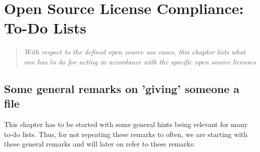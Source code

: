 %
%
%
%
%


\chapter{Open Source License Compliance: To-Do Lists}

\footnotesize
\begin{quote}\itshape
With respect to the defined open source use cases, this chapter lists what one
has to do for acting in accordance with the specific open source licenses
\end{quote}
\normalsize{}

\section{Some general remarks on 'giving' someone a file}

This chapter has to be started with some general hints being relevant for many
to-do lists. Thus, for not repeating these remarks to often, we are starting
with these general remarks and will later on refer to these remarks:

